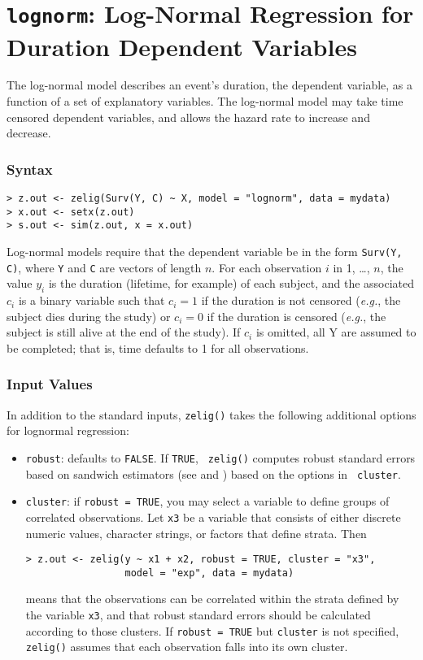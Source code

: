 \section{{\tt lognorm}: Log-Normal Regression for Duration
Dependent Variables}\label{lognorm}

The log-normal model describes an event's duration, the dependent
variable, as a function of a set of explanatory variables.  The
log-normal model may take time censored dependent variables, and
allows the hazard rate to increase and decrease.

\subsubsection{Syntax}

\begin{verbatim}
> z.out <- zelig(Surv(Y, C) ~ X, model = "lognorm", data = mydata)
> x.out <- setx(z.out)
> s.out <- sim(z.out, x = x.out)
\end{verbatim}
Log-normal models require that the dependent variable be in the form
{\tt Surv(Y, C)}, where {\tt Y} and {\tt C} are vectors of length $n$.
For each observation $i$ in 1, \dots, $n$, the value $y_i$ is the
duration (lifetime, for example) of each subject, and the associated
$c_i$ is a binary variable such that $c_i = 1$ if the duration is not
censored ({\it e.g.}, the subject dies during the study) or $c_i = 0$
if the duration is censored ({\it e.g.}, the subject is still alive at
the end of the study).  If $c_i$ is omitted, all Y are assumed to be
completed; that is, time defaults to 1 for all observations.

\subsubsection{Input Values} 

In addition to the standard inputs, {\tt zelig()} takes the following
additional options for lognormal regression:  
\begin{itemize}
\item {\tt robust}: defaults to {\tt FALSE}.  If {\tt TRUE}, {\tt
zelig()} computes robust standard errors based on sandwich estimators
(see \cite{Huber81} and \cite{White80}) based on the options in {\tt
cluster}.
\item {\tt cluster}:  if {\tt robust = TRUE}, you may select a
variable to define groups of correlated observations.  Let {\tt x3} be
a variable that consists of either discrete numeric values, character
strings, or factors that define strata.  Then
\begin{verbatim}
> z.out <- zelig(y ~ x1 + x2, robust = TRUE, cluster = "x3", 
                 model = "exp", data = mydata)
\end{verbatim}
means that the observations can be correlated within the strata defined by
the variable {\tt x3}, and that robust standard errors should be
calculated according to those clusters.  If {\tt robust = TRUE} but
{\tt cluster} is not specified, {\tt zelig()} assumes that each
observation falls into its own cluster.  
\end{itemize}  


